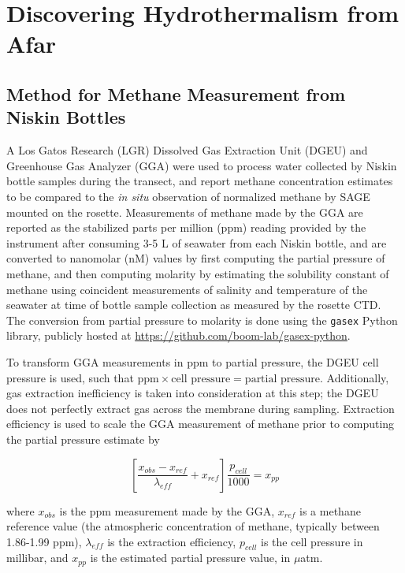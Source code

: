 \chapter{Discovering Hydrothermalism from Afar}
\label{app:perception}

\section{Method for Methane Measurement from Niskin Bottles}
\label{app:perception:methane}
A Los Gatos Research (LGR) Dissolved Gas Extraction Unit (DGEU) and Greenhouse Gas Analyzer (GGA) were used to process water collected by Niskin bottle samples during the transect, and report methane concentration estimates to be compared to the \emph{in situ} observation of normalized methane by SAGE mounted on the rosette. Measurements of methane made by the GGA are reported as the stabilized parts per million (ppm) reading provided by the instrument after consuming 3-5 L of seawater from each Niskin bottle, and are converted to nanomolar (nM) values by first computing the partial pressure of methane, and then computing molarity by estimating the solubility constant of methane using coincident measurements of salinity and temperature of the seawater at time of bottle sample collection as measured by the rosette CTD. The conversion from partial pressure to molarity is done using the \verb|gasex| Python library, publicly hosted at \url{https://github.com/boom-lab/gasex-python}. 

To transform GGA measurements in ppm to partial pressure, the DGEU cell pressure is used, such that $\text{ppm} \times \text{cell pressure} = \text{partial pressure}$. Additionally, gas extraction inefficiency is taken into consideration at this step; the DGEU does not perfectly extract gas across the membrane during sampling. Extraction efficiency is used to scale the GGA measurement of methane prior to computing the partial pressure estimate by 

\begin{equation}
    \label{eq:extraction}
    \left[\frac{x_{obs} - x_{ref}}{\lambda_{eff}} + x_{ref}\right]\frac{p_{cell}}{1000} = x_{pp}
\end{equation}

\noindent where $x_{obs}$ is the ppm measurement made by the GGA, $x_{ref}$ is a methane reference value (the atmospheric concentration of methane, typically between 1.86-1.99 ppm), $\lambda_{eff}$ is the extraction efficiency, $p_{cell}$ is the cell pressure in millibar, and $x_{pp}$ is the estimated partial pressure value, in $\mu$atm. 


